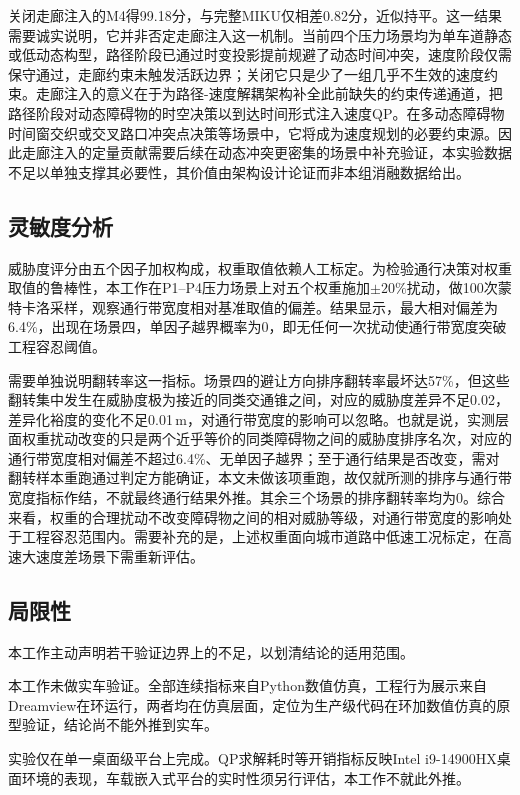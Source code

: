 \documentclass[a4paper,11pt]{ctexart}
\theoremstyle{definition}
\begin{document}
关闭走廊注入的M4得99.18分，与完整MIKU仅相差0.82分，近似持平。这一结果需要诚实说明，它并非否定走廊注入这一机制。当前四个压力场景均为单车道静态或低动态构型，路径阶段已通过时变投影提前规避了动态时间冲突，速度阶段仅需保守通过，走廊约束未触发活跃边界；关闭它只是少了一组几乎不生效的速度约束。走廊注入的意义在于为路径-速度解耦架构补全此前缺失的约束传递通道，把路径阶段对动态障碍物的时空决策以到达时间形式注入速度QP。在多动态障碍物时间窗交织或交叉路口冲突点决策等场景中，它将成为速度规划的必要约束源。因此走廊注入的定量贡献需要后续在动态冲突更密集的场景中补充验证，本实验数据不足以单独支撑其必要性，其价值由架构设计论证而非本组消融数据给出。

\subsection{灵敏度分析}
\label{subsec:exp_sensitivity}

威胁度评分由五个因子加权构成，权重取值依赖人工标定。为检验通行决策对权重取值的鲁棒性，本工作在P1--P4压力场景上对五个权重施加$\pm 20\%$扰动，做100次蒙特卡洛采样，观察通行带宽度相对基准取值的偏差。结果显示，最大相对偏差为6.4\%，出现在场景四，单因子越界概率为0，即无任何一次扰动使通行带宽度突破工程容忍阈值。

需要单独说明翻转率这一指标。场景四的避让方向排序翻转率最坏达57\%，但这些翻转集中发生在威胁度极为接近的同类交通锥之间，对应的威胁度差异不足0.02，差异化裕度的变化不足0.01\,m，对通行带宽度的影响可以忽略。也就是说，实测层面权重扰动改变的只是两个近乎等价的同类障碍物之间的威胁度排序名次，对应的通行带宽度相对偏差不超过6.4\%、无单因子越界；至于通行结果是否改变，需对翻转样本重跑通过判定方能确证，本文未做该项重跑，故仅就所测的排序与通行带宽度指标作结，不就最终通行结果外推。其余三个场景的排序翻转率均为0。综合来看，权重的合理扰动不改变障碍物之间的相对威胁等级，对通行带宽度的影响处于工程容忍范围内。需要补充的是，上述权重面向城市道路中低速工况标定，在高速大速度差场景下需重新评估。

\subsection{局限性}
\label{subsec:exp_limitations}

本工作主动声明若干验证边界上的不足，以划清结论的适用范围。

本工作未做实车验证。全部连续指标来自Python数值仿真，工程行为展示来自Dreamview在环运行，两者均在仿真层面，定位为生产级代码在环加数值仿真的原型验证，结论尚不能外推到实车。

实验仅在单一桌面级平台上完成。QP求解耗时等开销指标反映Intel i9-14900HX桌面环境的表现，车载嵌入式平台的实时性须另行评估，本工作不就此外推。
\end{document}
